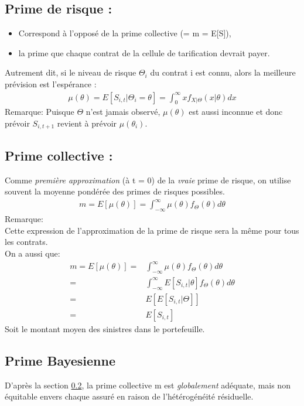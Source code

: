 \subsection{Prime de risque :}
\begin{itemize}
\item Correspond à l'opposé de la prime collective (= m = E[S]),
\item la prime que chaque contrat de la cellule de tarification devrait payer.
\end{itemize}
Autrement dit, si le niveau de risque $\Theta_i$ du contrat i est connu, alors la meilleure prévision est l'espérance :
\begin{align*}
\mu(\theta) = E[S_{i,t}|\Theta_i = \theta] = \int_{0}^{\infty} x f_{X|\Theta}(x|\theta)dx
\end{align*}
Remarque: Puisque $\Theta$ n'est jamais observé, $\mu(\theta)$ est aussi inconnue et donc prévoir $S_{i, t+1}$ revient à prévoir $\mu(\theta_i)$.

\subsection{Prime collective :}
\label{sec:sub:prime collective}
Comme \emph{première approximation} (à t = 0) de la \textit{vraie} prime de risque, on utilise souvent la moyenne pondérée des primes de risques possibles.
\begin{align*}
m = E[\mu(\theta)] = \int_{-\infty}^{\infty} \mu(\theta) f_{\Theta}(\theta)d\theta
\end{align*}
Remarque:\\
Cette expression de l'approximation de la prime de risque sera la même pour tous les contrats.\\
On a aussi que:
\begin{align*}
m = E[\mu(\theta)] =& \int_{-\infty}^{\infty} \mu(\theta) f_{\Theta}(\theta)d\theta \\
=& \int_{-\infty}^{\infty} E[S_{i,t}|\theta] f_{\Theta}(\theta)d\theta \\
=& E[E[S_{i,t}|\Theta]]\\
=& E[S_{i,t}]
\end{align*}
Soit le montant moyen des sinistres dans le portefeuille.

\subsection{Prime Bayesienne}
D'après la section \ref{sec:sub:prime collective}, la prime collective m est \emph{globalement} adéquate, mais non équitable envers chaque assuré en raison de l'hétérogénéité résiduelle. 

